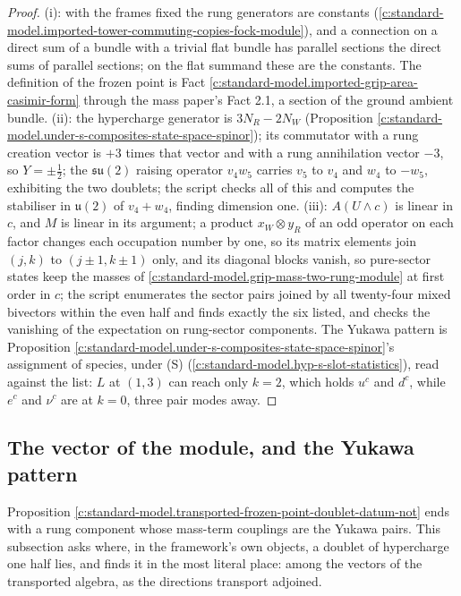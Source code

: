 \documentclass[11pt]{article}
\theoremstyle{definition}
\theoremstyle{plain}
\providecommand{\su}{}\renewcommand{\su}{\mathfrak{su}}
\providecommand{\uu}{}\renewcommand{\uu}{\mathfrak{u}}
\begin{document}
\begin{proof}
(i): with the frames fixed the rung generators are constants (\ref{c:standard-model.imported-tower-commuting-copies-fock-module}), and a connection on a direct sum of a bundle with a trivial flat bundle has parallel sections the direct sums of parallel sections; on the flat summand these are the constants. The definition of the frozen point is Fact \ref{c:standard-model.imported-grip-area-casimir-form} through the mass paper's Fact 2.1, a section of the ground ambient bundle. (ii): the hypercharge generator is $3N_{R} - 2N_{W}$ (Proposition \ref{c:standard-model.under-s-composites-state-space-spinor}); its commutator with a rung creation vector is $+3$ times that vector and with a rung annihilation vector $-3$, so $Y = \pm\tfrac12$; the $\su(2)$ raising operator $v_{4}w_{5}$ carries $v_{5}$ to $v_{4}$ and $w_{4}$ to $-w_{5}$, exhibiting the two doublets; the script checks all of this and computes the stabiliser in $\uu(2)$ of $v_{4} + w_{4}$, finding dimension one. (iii): $A(U \wedge c)$ is linear in $c$, and $M$ is linear in its argument; a product $x_{W} \otimes y_{R}$ of an odd operator on each factor changes each occupation number by one, so its matrix elements join $(j,k)$ to $(j \pm 1, k \pm 1)$ only, and its diagonal blocks vanish, so pure-sector states keep the masses of \ref{c:standard-model.grip-mass-two-rung-module} at first order in $c$; the script enumerates the sector pairs joined by all twenty-four mixed bivectors within the even half and finds exactly the six listed, and checks the vanishing of the expectation on rung-sector components. The Yukawa pattern is Proposition \ref{c:standard-model.under-s-composites-state-space-spinor}'s assignment of species, under (S) (\ref{c:standard-model.hyp-s-slot-statistics}), read against the list: $L$ at $(1,3)$ can reach only $k = 2$, which holds $u^{c}$ and $d^{c}$, while $e^{c}$ and $\nu^{c}$ are at $k = 0$, three pair modes away.

\end{proof}

\subsection*{The vector of the module, and the Yukawa pattern}
\label{c:note.standard-model.setting-vector-module-yukawa-pattern}
Proposition \ref{c:standard-model.transported-frozen-point-doublet-datum-not} ends with a rung component whose mass-term couplings are the Yukawa pairs. This subsection asks where, in the framework's own objects, a doublet of hypercharge one half lies, and finds it in the most literal place: among the vectors of the transported algebra, as the directions transport adjoined.
\end{document}
